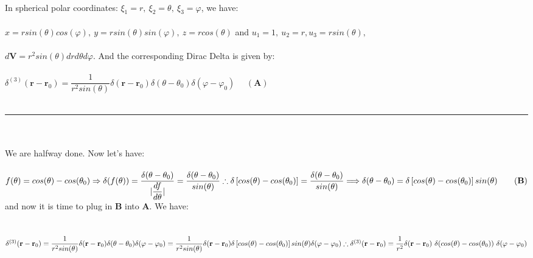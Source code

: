 \documentclass[fleqn]{article}
\begin{document}
\begin{enumerate}
{        \\
        In spherical polar coordinates: $\xi_1=r, ~ \xi_2=\theta, ~ \xi_3=\varphi$, we have: \\
        \\
        $x=r sin(\theta) cos(\varphi), ~ y=r sin(\theta) sin(\varphi), ~ z=r cos(\theta)$ and $u_1=1, ~ u_2=r, u_3=rsin(\theta),$ \\ \\ 
        $d\mathbf{V}=r^2 sin(\theta) dr d\theta d\varphi$. And the corresponding Dirac Delta is given by: \\
        \\
        $
          \delta^{(3)}(\mathbf{r}-\mathbf{r}_0)=\dfrac{1}{r^2 sin(\theta)} \delta(\mathbf{r}-\mathbf{r}_0) \delta(\theta-\theta_0) \delta(\varphi-\varphi_0) ~~~~~~ \mathbf{(A)}
        $
        \\ \\
        \rule{15cm}{1pt}
        \\
        \\
        We are halfway done. Now let's have: \\
        \\
        $
          f(\theta)=cos(\theta)-cos(\theta_0) \Rightarrow \delta(f(\theta))=\dfrac{\delta(\theta-\theta_0)}{|\dfrac{df}{d\theta}|}=\dfrac{\delta(\theta-\theta_0)}{sin(\theta)} \\
          \\
          \therefore \delta\left[cos(\theta)-cos(\theta_0)\right]=\dfrac{\delta(\theta-\theta_0)}{sin(\theta)} \Longrightarrow \delta(\theta-\theta_0)=\delta\left[cos(\theta)-cos(\theta_0)\right] sin(\theta) ~~~~~~ \mathbf{(B)} \\ \\
        $
        and now it is time to plug in $\mathbf{B}$ into $\mathbf{A}$. We have: \\
        \\
        \\
        $
          \delta^{(3)}(\mathbf{r}-\mathbf{r}_0)=\dfrac{1}{r^2 sin(\theta)} \delta(\mathbf{r}-\mathbf{r}_0) \delta(\theta-\theta_0) \delta(\varphi-\varphi_0) \\
          \\
          =\dfrac{1}{r^2 sin(\theta)} \delta(\mathbf{r}-\mathbf{r}_0) \delta\left[cos(\theta)-cos(\theta_0)\right] sin(\theta) \delta(\varphi-\varphi_0) \\
          \\
          \\
          \\
          \therefore \delta^{(3)}(\mathbf{r}-\mathbf{r}_0)=\dfrac{1}{r^2} \delta(\mathbf{r}-\mathbf{r}_0) ~ \delta(cos(\theta)-cos(\theta_0)) ~ \delta(\varphi-\varphi_0)
        $
      }



\end{enumerate}
\end{document}
